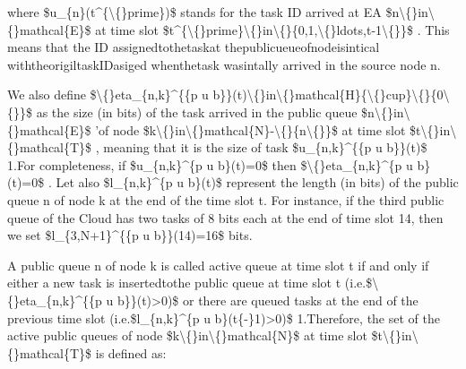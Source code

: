 \documentclass{article}
\begin{document}
where \$u\_\{n\}(t\textasciicircum{}\{\textbackslash\{\}prime\})\$ stands for the task ID arrived at EA \$n\textbackslash\{\}in\textbackslash\{\}mathcal\{E\}\$ at time slot \$t\textasciicircum{}\{\textbackslash\{\}prime\}\textbackslash\{\}in\textbackslash\{\}\{0,1,\textbackslash\{\}ldots,t-1\textbackslash\{\}\}\$ . This means that the ID assignedtothetaskat thepublicueueofnodeisintical withtheorigiltaskIDasiged whenthetask wasintally arrived in the source node n.

We also define \$\textbackslash\{\}eta\_\{n,k\}\textasciicircum{}\{\{p u b\}\}(t)\textbackslash\{\}in\textbackslash\{\}mathcal\{H\}\{\textbackslash\{\}cup\}\textbackslash\{\}\{0\textbackslash\{\}\}\$ as the size (in bits) of the task arrived in the public queue \$n\textbackslash\{\}in\textbackslash\{\}mathcal\{E\}\$ 'of node \$k\textbackslash\{\}in\textbackslash\{\}mathcal\{N\}-\textbackslash\{\}\{n\textbackslash\{\}\}\$ at time slot \$t\textbackslash\{\}in\textbackslash\{\}mathcal\{T\}\$ , meaning that it is the size of task \$u\_\{n,k\}\textasciicircum{}\{\{p u b\}\}(t)\$ 1.For completeness, if \$u\_\{n,k\}\textasciicircum{}\{p u b\}(t)=0\$ then \$\textbackslash\{\}eta\_\{n,k\}\textasciicircum{}\{p u b\}(t)=0\$ . Let also \$l\_\{n,k\}\textasciicircum{}\{p u b\}(t)\$ represent the length (in bits) of the public queue n of node k at the end of the time slot t. For instance, if the third public queue of the Cloud has two tasks of 8 bits each at the end of time slot 14, then we set \$l\_\{3,N+1\}\textasciicircum{}\{\{p u b\}\}(14)=16\$ bits.

A public queue n of node k is called active queue at time slot t if and only if either a new task is insertedtothe public queue at time slot t (i.e.\$\textbackslash\{\}eta\_\{n,k\}\textasciicircum{}\{\{p u b\}\}(t)>0)\$ or there are queued tasks at the end of the previous time slot (i.e.\$l\_\{n,k\}\textasciicircum{}\{p u b\}(t\{-\}1)>0)\$ 1.Therefore, the set of the active public queues of node \$k\textbackslash\{\}in\textbackslash\{\}mathcal\{N\}\$ at time slot \$t\textbackslash\{\}in\textbackslash\{\}mathcal\{T\}\$ is defined as:
\end{document}
